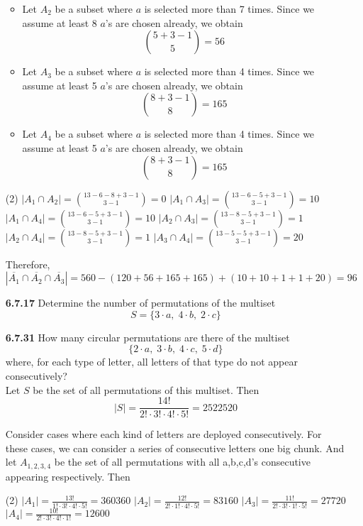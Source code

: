 \documentclass[12pt]{article}
\begin{document}
\begin{enumerate}
\begin{itemize}
         \item Let $A_2$ be a subset where $a$ is selected more than 7 times. Since we assume at least 8 $a$'s are chosen already, we obtain
        $$\binom{5+3-1}{5} = 56$$
        
         \item Let $A_3$ be a subset where $a$ is selected more than 4 times. Since we assume at least 5 $a$'s are chosen already, we obtain
        $$\binom{8+3-1}{8} = 165$$
        
         \item Let $A_4$ be a subset where $a$ is selected more than 4 times. Since we assume at least 5 $a$'s are chosen already, we obtain
        $$\binom{8+3-1}{8} = 165$$
    \end{itemize}
    
    \begin{tasks}[style=itemize, column-sep=0mm, label-align=left, label-offset={0mm}, label-width={3mm}, item-indent={15mm}](2)    
        \task $|A_1\cap A_2| = \binom{13-6-8+3-1}{3-1} = 0$
        \task $|A_1\cap A_3| = \binom{13-6-5+3-1}{3-1} = 10$
        \task $|A_1\cap A_4| = \binom{13-6-5+3-1}{3-1} = 10$
        \task $|A_2\cap A_3| = \binom{13-8-5+3-1}{3-1} = 1$
        \task $|A_2\cap A_4| = \binom{13-8-5+3-1}{3-1} = 1$
        \task $|A_3\cap A_4| = \binom{13-5-5+3-1}{3-1} = 20$\\
    \end{tasks}
    
    Therefore,
    $$|\overline{A_1}\cap\overline{A_2}\cap\overline{A_3}| = 560-(120+56+165+165)+(10+10+1+1+20) = 96$$
    
    \vspace{1.5\baselineskip}
    \item[\bf 6.7.17] Determine the number of permutations of the multiset
    $$S= \{3\cdot a,\;4\cdot b,\;2\cdot c\}$$

    \item[\bf 6.7.31] How many circular permutations are there of the multiset
    $$\{2\cdot a,\;3\cdot b,\;4\cdot c,\;5\cdot d\}$$
    where, for each type of letter, all letters of that type do not appear consecutively?\\
    
    Let $S$ be the set of all permutations of this multiset. Then
    $$|S| = \frac{14!}{2!\cdot 3!\cdot 4!\cdot 5!} = 2522520$$
    
    Consider cases where each kind of letters are deployed consecutively. For these cases, we can consider a series of consecutive letters one big chunk. And let $A_{1,2,3,4}$ be the set of all permutations with all a,b,c,d's consecutive appearing respectively. Then
    \begin{tasks}[style=itemize, column-sep=-52mm, label-align=center, label-offset={0mm}, label-width={3mm}, item-indent={20mm}](2)%
    \task $|A_1| = \frac{13!}{1!\cdot 3!\cdot 4!\cdot 5!} = 360360$
    \task $|A_2| = \frac{12!}{2!\cdot 1!\cdot 4!\cdot 5!} = 83160$
    \task $|A_3| = \frac{11!}{2!\cdot 3!\cdot 1!\cdot 5!} = 27720$
    \task $|A_4| = \frac{10!}{2!\cdot 3!\cdot 4!\cdot 1!} = 12600$
    \end{tasks}
    

\end{enumerate}
\end{document}
